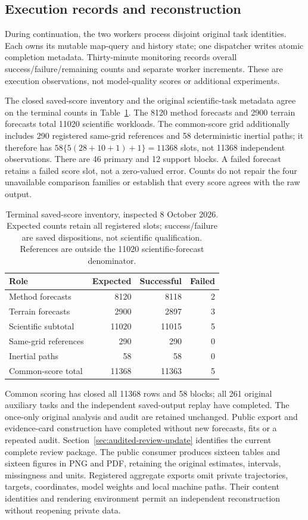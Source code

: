 \documentclass[11pt]{article}
\begin{document}
\subsection{Execution records and reconstruction}
\label{sec:execution-reconstruction}
During continuation, the two workers process disjoint original task identities.
Each owns its mutable map-query and history state; one dispatcher writes
atomic completion metadata. Thirty-minute monitoring records overall
success/failure/remaining counts and separate worker increments. These are
execution observations, not model-quality scores or additional experiments.

The closed saved-score inventory and the original scientific-task metadata
agree on the terminal counts in Table~\ref{tab:terminal-score-inventory}.
The 8120 method forecasts and 2900 terrain forecasts total 11020 scientific
workloads. The common-score grid additionally includes 290 registered
same-grid references and 58 deterministic inertial paths; it therefore has
$58\{5(28+10+1)+1\}=11368$ slots, not 11368 independent observations.
There are 46 primary and 12 support blocks. A failed forecast retains a failed
score slot, not a zero-valued error. Counts do not repair the four unavailable
comparison families or establish that every score agrees with the raw output.

\begin{table}[htbp]\centering\small
\caption{Terminal saved-score inventory, inspected 8 October 2026.
Expected counts retain all registered slots; success/failure are saved
dispositions, not scientific qualification. References are outside the
11020 scientific-forecast denominator.}\label{tab:terminal-score-inventory}
\begin{tabular}{@{}lrrr@{}}\toprule
Role & Expected & Successful & Failed\\\midrule
Method forecasts & 8120 & 8118 & 2\\
Terrain forecasts & 2900 & 2897 & 3\\
Scientific subtotal & 11020 & 11015 & 5\\
Same-grid references & 290 & 290 & 0\\
Inertial paths & 58 & 58 & 0\\
Common-score total & 11368 & 11363 & 5\\
\bottomrule\end{tabular}\end{table}

Common scoring has closed all 11368 rows and 58 blocks; all 261 original
auxiliary tasks and the independent saved-output replay have completed.
The once-only original analysis and audit are retained unchanged. Public
export and evidence-card construction have completed without new forecasts,
fits or a repeated audit. Section~\ref{sec:audited-review-update} identifies
the current complete review package. The public consumer produces sixteen tables
and sixteen figures in PNG and PDF, retaining the original estimates,
intervals, missingness and units. Registered aggregate exports omit private trajectories,
targets, coordinates, model weights and local machine paths. Their content
identities and rendering environment permit an independent reconstruction
without reopening private data.
\end{document}
